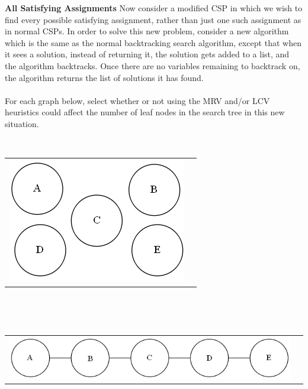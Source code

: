 \begin{question}[]{\bf All Satisfying Assignments}
Now consider a modified CSP in which we wish to find every possible satisfying assignment, rather than just one such assignment as in normal CSPs. In order to solve this new problem, consider a new algorithm which is the same as the normal backtracking search algorithm, except that when it sees a solution, instead of returning it, the solution gets added to a list, and the algorithm backtracks. Once there are no variables remaining to backtrack on, the algorithm returns the list of solutions it has found.\\\\
For each graph below, select whether or not using the MRV and/or LCV heuristics could affect the number of leaf nodes in the search tree in this new situation.


\begin{subquestion}[2]{}\\
\begin{tabular}{cl}
\multirow{1}{*}{\includegraphics[scale=0.5]{figures/disconnected.png} \hspace{1.4in}}
\AnswerOneCi

\end{tabular}\\
\end{subquestion}

\vspace{-.1in}
\begin{subquestion}[2]{}\\
\begin{tabular}{cl}


\multirow{1}{*}{\includegraphics[scale=0.5]{figures/chain.png} \hspace{0.260in}}
\AnswerOneCii


\end{tabular}
\end{subquestion}
\end{question}
